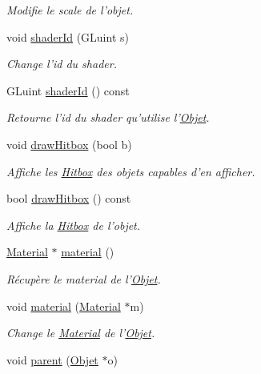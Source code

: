 \begin{DoxyCompactItemize}
\begin{DoxyCompactList}\small\item\em Modifie le scale de l'objet. \end{DoxyCompactList}\item 
void \hyperlink{class_objet_a13f08bf7d1265bbf4ade92b755b27c1b}{shader\+Id} (G\+Luint s)
\begin{DoxyCompactList}\small\item\em Change l'id du shader. \end{DoxyCompactList}\item 
G\+Luint \hyperlink{class_objet_a1a6a7ddf0136e2b685c07778b681c976}{shader\+Id} () const 
\begin{DoxyCompactList}\small\item\em Retourne l'id du shader qu'utilise l'\hyperlink{class_objet}{Objet}. \end{DoxyCompactList}\item 
void \hyperlink{class_objet_a3ce451437b7d7d22fdfd8cdb10b347fa}{draw\+Hitbox} (bool b)
\begin{DoxyCompactList}\small\item\em Affiche les \hyperlink{class_hitbox}{Hitbox} des objets capables d'en afficher. \end{DoxyCompactList}\item 
bool \hyperlink{class_objet_a17afdd67513cf35ab527af241cc7f769}{draw\+Hitbox} () const 
\begin{DoxyCompactList}\small\item\em Affiche la \hyperlink{class_hitbox}{Hitbox} de l'objet. \end{DoxyCompactList}\item 
\hyperlink{class_material}{Material} $\ast$ \hyperlink{class_objet_a5b8f371853435fb08bba5163cb4dbe09}{material} ()
\begin{DoxyCompactList}\small\item\em Récupère le material de l'\hyperlink{class_objet}{Objet}. \end{DoxyCompactList}\item 
void \hyperlink{class_objet_a470e028ee53141cf9d11d107317989b7}{material} (\hyperlink{class_material}{Material} $\ast$m)
\begin{DoxyCompactList}\small\item\em Change le \hyperlink{class_material}{Material} de l'\hyperlink{class_objet}{Objet}. \end{DoxyCompactList}\item 
void \hyperlink{class_objet_a95e63a98dc9dc485fe874df30f2069ee}{parent} (\hyperlink{class_objet}{Objet} $\ast$o)

\end{DoxyCompactItemize}
